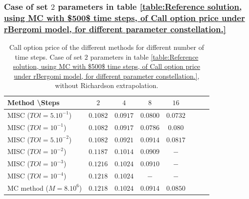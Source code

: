 \documentclass[11pt]{article}
\begin{document}
\subsubsection{Case of set $2$ parameters in table \ref{table:Reference solution, using MC with $500$ time steps, of Call option price under rBergomi model, for different parameter constellation.}}
\label{sec:Case of set $2$ parameters}


\begin{table}[h!]
	\centering
	\begin{tabular}{l*{6}{c}r}
		Method \textbackslash  Steps            & $2$ & $4$ & $8$ & $16$  \\
		\hline
			MISC ($TOl=5.10^{-1}$)  & $0.1082$ & $0.0917$ & $0.0800$ & $0.0732$  \\
		MISC ($TOl=10^{-1}$)  & $0.1082$ & $0.0917$ & $0.0786$ & $0.080$  \\
			MISC ($TOl=5.10^{-2}$)  & $0.1082$ & $0.0921$ & $0.0914$ & $0.0817$  \\
		MISC ($TOl=10^{-2}$)  & $0.1187$ &  $0.1014$ & $0.0909$ & $-$  \\
		MISC ($TOl=10^{-3}$)        & $0.1216$ &$0.1024$ &  $0.0910$ &  $-$ \\
			MISC ($TOl=10^{-4}$)        & $0.1218$ &$0.1024$ &  $-$ &  $-$ \\
	\hline
		MC method ($M=8.10^{6}$)   & $0.1218 $  & $0.1024 $  & $0.0914$ & $0.0850 $ \\		
		\hline
	\end{tabular}
	\caption{ Call option price of the different methods for different number of time steps. Case of set $2$ parameters in table \ref{table:Reference solution, using MC with $500$ time steps, of Call option price under rBergomi model, for different parameter constellation.}, without Richardson extrapolation.}
	\label{table: Call option price of the different methods for different number of time steps. Case set 2}
\end{table}
\end{document}
